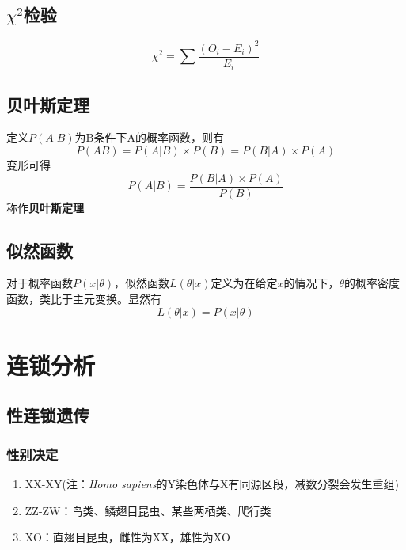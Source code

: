 \documentclass[a4paper, 12pt]{report}
\begin{document}
\section{$\chi^2$检验}
\[\chi^2 = \sum \dfrac{(O_i - E_i)^2}{E_i}\]
\section{贝叶斯定理}
定义\(P(A|B)\)为B条件下A的概率函数，则有\[P(AB)=P(A|B)\times P(B)=P(B|A)\times P(A)\]
变形可得\[P(A|B)=\dfrac{P(B|A)\times P(A)}{P(B)}\]
称作\textbf{贝叶斯定理}
\section{似然函数}
对于概率函数\(P(x|\theta)\)，似然函数\(L(\theta|x)\)定义为在给定\(x\)的情况下，\(\theta\)的概率密度函数，类比于主元变换。显然有\[L(\theta|x) = P(x|\theta)\]
\chapter{连锁分析}
\section{性连锁遗传}
\subsection{性别决定}
\begin{enumerate}
    \item XX-XY(注：\textit{Homo sapiens}的Y染色体与X有同源区段，减数分裂会发生重组)
    \item ZZ-ZW：鸟类、鳞翅目昆虫、某些两栖类、爬行类
    \item XO：直翅目昆虫，雌性为XX，雄性为XO
\end{enumerate}
\end{document}
